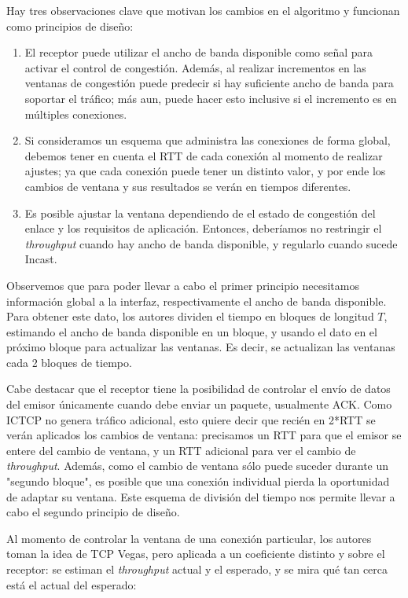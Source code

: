\documentclass[runningheads,a4paper]{llncs}
\begin{document}
Hay tres observaciones clave que motivan los cambios en el algoritmo y funcionan como principios de diseño:

\begin{enumerate}
    \item El receptor puede utilizar el ancho de banda disponible como señal para activar el control de congestión. Además, al realizar incrementos en las ventanas de congestión puede predecir si hay suficiente ancho de banda para soportar el tráfico; más aun, puede hacer esto inclusive si el incremento es en múltiples conexiones.
    
    \item Si consideramos un esquema que administra las conexiones de forma global, debemos tener en cuenta el RTT de cada conexión al momento de realizar ajustes; ya que cada conexión puede tener un distinto valor, y por ende los cambios de ventana y sus resultados se verán en tiempos diferentes.
    
    \item Es posible ajustar la ventana dependiendo de el estado de congestión del enlace y los requisitos de aplicación. Entonces, deberíamos no restringir el \textit{throughput} cuando hay ancho de banda disponible, y regularlo cuando sucede Incast.
\end{enumerate}

Observemos que para poder llevar a cabo el primer principio necesitamos información global a la interfaz, respectivamente el ancho de banda disponible. Para obtener este dato, los autores dividen el tiempo en bloques de longitud $T$, estimando el ancho de banda disponible en un bloque, y usando el dato en el próximo bloque para actualizar las ventanas. Es decir, se actualizan las ventanas cada 2 bloques de tiempo.

Cabe destacar que el receptor tiene la posibilidad de controlar el envío de datos del emisor únicamente cuando debe enviar un paquete, usualmente ACK. Como ICTCP no genera tráfico adicional, esto quiere decir que recién en 2*RTT se verán aplicados los cambios de ventana: precisamos un RTT para que el emisor se entere del cambio de ventana, y un RTT adicional para ver el cambio de \textit{throughput}. Además, como el cambio de ventana sólo puede suceder durante un "segundo bloque", es posible que una conexión individual pierda la oportunidad de adaptar su ventana. Este esquema de división del tiempo nos permite llevar a cabo el segundo principio de diseño.

Al momento de controlar la ventana de una conexión particular, los autores toman la idea de TCP Vegas, pero aplicada a un coeficiente distinto y sobre el receptor: se estiman el \textit{throughput} actual y el esperado, y se mira qué tan cerca está el actual del esperado:
\end{document}
